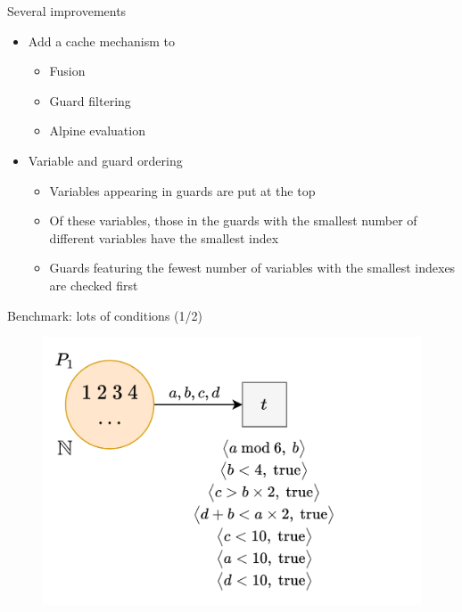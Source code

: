 \documentclass[10pt]{beamer}
\begin{document}
\begin{frame}[fragile]{Several improvements}
    \begin{itemize}
        \setlength\itemsep{1.15em}
        \item Add a cache mechanism to \vspace{\topsep}\begin{itemize}
            \setlength\itemsep{0.45em}
            \item Fusion
            \item Guard filtering
            \item Alpine evaluation
        \end{itemize}
        \item Variable and guard ordering\vspace{\topsep}\begin{itemize}
            \setlength\itemsep{0.45em}
            \item Variables appearing in guards are put at the top
            \item Of these variables, those in the guards with the smallest number of different variables have the
              smallest index
            \item Guards featuring the fewest number of variables with the smallest indexes are checked first 
        \end{itemize}
    \end{itemize}
\end{frame}

\begin{frame}[fragile]{Benchmark: lots of conditions (1/2)}
    \begin{figure}
        \centering
        \includegraphics[width=1.0\textwidth]{lotsc.png}
    \end{figure}
\end{frame}
\end{document}

